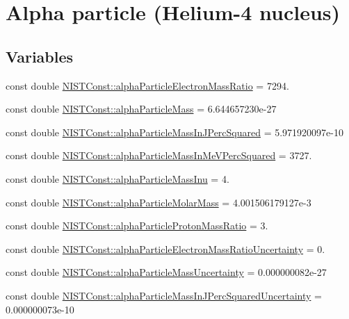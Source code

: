 \hypertarget{group___alpha}{}\section{Alpha particle (Helium-\/4 nucleus)}
\label{group___alpha}
\subsection*{Variables}
\begin{DoxyCompactItemize}
\item 
const double \hyperlink{group___alpha_ga9f00b32c60f1bc5b8a950b58e64d08c8}{N\+I\+S\+T\+Const\+::alpha\+Particle\+Electron\+Mass\+Ratio} = 7294.
\item 
const double \hyperlink{group___alpha_ga5a2a4f4310d2e3584253471fe4381b93}{N\+I\+S\+T\+Const\+::alpha\+Particle\+Mass} = 6.\+644657230e-\/27
\item 
const double \hyperlink{group___alpha_ga90b635a865e315d2c4cd14c26560c7dd}{N\+I\+S\+T\+Const\+::alpha\+Particle\+Mass\+In\+J\+Perc\+Squared} = 5.\+971920097e-\/10
\item 
const double \hyperlink{group___alpha_ga34f456e4d23d54ea0231ada958882a38}{N\+I\+S\+T\+Const\+::alpha\+Particle\+Mass\+In\+Me\+V\+Perc\+Squared} = 3727.
\item 
const double \hyperlink{group___alpha_ga1233ffb0d6537e112ce39623e6c6d0d5}{N\+I\+S\+T\+Const\+::alpha\+Particle\+Mass\+Inu} = 4.
\item 
const double \hyperlink{group___alpha_ga06d92f78de04d4e1d79b8468b04959ef}{N\+I\+S\+T\+Const\+::alpha\+Particle\+Molar\+Mass} = 4.\+001506179127e-\/3
\item 
const double \hyperlink{group___alpha_ga4629465057dc35ad7eecca610bcbd092}{N\+I\+S\+T\+Const\+::alpha\+Particle\+Proton\+Mass\+Ratio} = 3.
\item 
const double \hyperlink{group___alpha_gab0ff5a8444a405504f7bc319cc48561d}{N\+I\+S\+T\+Const\+::alpha\+Particle\+Electron\+Mass\+Ratio\+Uncertainty} = 0.
\item 
const double \hyperlink{group___alpha_ga9183d4ef147d5a96c2980b37937ecfc4}{N\+I\+S\+T\+Const\+::alpha\+Particle\+Mass\+Uncertainty} = 0.\+000000082e-\/27
\item 
const double \hyperlink{group___alpha_ga198b93b4a36d33373d91234150ca0ead}{N\+I\+S\+T\+Const\+::alpha\+Particle\+Mass\+In\+J\+Perc\+Squared\+Uncertainty} = 0.\+000000073e-\/10

\end{DoxyCompactItemize}
